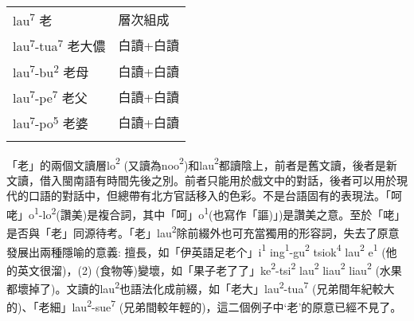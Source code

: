 \tabletail{}
\tablelasttail{}
\begin{tabularx}{\textwidth}{XX}
\lsptoprule

{\sffamily \textrm{lau}\textrm{\textsuperscript{7}} \textrm{老}} & 層次組成\\
{\sffamily \textrm{lau}\textrm{\textsuperscript{7}}\textrm{{}-tua}\textrm{\textsuperscript{7}} \textrm{老大儂}} & 白讀+白讀\\
{\sffamily \textrm{lau}\textrm{\textsuperscript{7}}\textrm{{}-bu}\textrm{\textsuperscript{2}} \textrm{老母}} & 白讀+白讀\\
{\sffamily \textrm{lau}\textrm{\textsuperscript{7}}\textrm{{}-pe}\textrm{\textsuperscript{7}} \textrm{老父}} & 白讀+白讀\\
{\sffamily \textrm{lau}\textrm{\textsuperscript{7}}\textrm{{}-po}\textrm{\textsuperscript{5}} \textrm{老婆}} & 白讀+白讀\\
\lspbottomrule
\end{tabularx}
\textrm{「老」的兩個文讀層lo}\textrm{\textsuperscript{2}} \textrm{(又讀為noo}\textrm{\textsuperscript{2}}\textrm{)和lau}\textrm{\textsuperscript{2}}\textrm{都讀陰上，前者是舊文讀，後者是新文讀，借入閩南語有時間先後之別。前者只能用於戲文中的對話，後者可以用於現代的口語的對話中，但總帶有北方官話移入的色彩。不是台語固有的表現法。「呵咾」o}\textrm{\textsuperscript{1}}\textrm{{}-lo}\textrm{\textsuperscript{2}}\textrm{(讚美)是複合詞，其中「呵」o}\textrm{\textsuperscript{1}}\textrm{(也寫作「謳)」)是讚美之意。至於「咾」是否與「老」同源待考。「老」lau}\textrm{\textsuperscript{2}}\textrm{除前綴外也可充當獨用的形容詞，失去了原意發展出兩種隱喻的意義: 擅長，如「伊英語足老个」i}\textrm{\textsuperscript{1}} \textrm{ing}\textrm{\textsuperscript{1}}\textrm{{}-gu}\textrm{\textsuperscript{2}} \textrm{tsiok}\textrm{\textsuperscript{4}} \textrm{lau}\textrm{\textsuperscript{2}} \textrm{e}\textrm{\textsuperscript{1}} \textrm{(他的英文很溜)}，\textrm{(2) (食物等)變壞，如「果子老了了」ke}\textrm{\textsuperscript{2}}\textrm{{}-tsi}\textrm{\textsuperscript{2}} \textrm{lau}\textrm{\textsuperscript{2}} \textrm{liau}\textrm{\textsuperscript{2}} \textrm{liau}\textrm{\textsuperscript{2}} \textrm{(水果都壞掉了)}。\textrm{文讀的lau}\textrm{\textsuperscript{2}}\textrm{也語法化成前綴，如「老大」lau}\textrm{\textsuperscript{2}}\textrm{{}-tua}\textrm{\textsuperscript{7}} \textrm{(兄弟間年紀較大的)}、\textrm{「老細」lau}\textrm{\textsuperscript{2}}\textrm{{}-sue}\textrm{\textsuperscript{7}} \textrm{(兄弟間較年輕的)，這二個例子中‘老’的原意已經不見了。}

